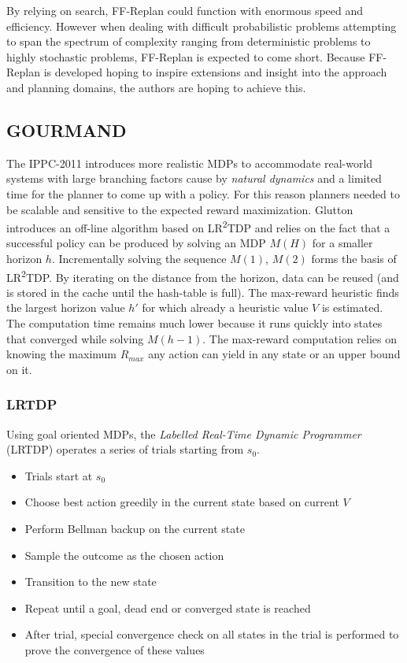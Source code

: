 \documentclass[runningheads,a4paper]{llncs}
\begin{document}
By relying on search, FF-Replan could function with enormous speed and efficiency. However when dealing with difficult probabilistic problems attempting to span the spectrum of complexity ranging from deterministic problems to highly stochastic problems, FF-Replan is expected to come short. Because FF-Replan is developed hoping to inspire extensions and insight into the approach and planning domains, the authors are hoping to achieve this.


\subsection{GOURMAND}

The IPPC-2011 introduces more realistic MDPs to accommodate real-world systems with large branching factors cause by \emph{natural dynamics} and a limited time for the planner to come up with a policy. For this reason planners needed to be scalable and sensitive to the expected reward maximization. Glutton introduces an off-line algorithm based on LR\textsuperscript{2}TDP and relies on the fact that a successful policy can be produced by solving an MDP $M(H)$ for a smaller horizon $h$. Incrementally solving the sequence $M(1)$, $M(2)$ forms the basis of LR\textsuperscript{2}TDP\@. By iterating on the distance from the horizon, data can be reused (and is stored in the cache until the hash-table is full). The max-reward heuristic finds the largest horizon value $h'$ for which already a heuristic value $V$ is estimated. The  computation time remains much lower because it runs quickly into states that converged while solving $M(h-1)$. The max-reward computation relies on knowing the maximum $R_{max}$ any action can yield in any state or an upper bound on it.

\subsubsection{LRTDP}
Using goal oriented MDPs, the \emph{Labelled Real-Time Dynamic Programmer} (LRTDP) operates a series of trials starting from $s_0$.

\begin{itemize}
	\item Trials start at $s_0$
	\item Choose best action greedily in the current state based on current $V$
	\item Perform  Bellman backup on the current state
	\item Sample the outcome as the chosen action
	\item Transition to the new state
	\item Repeat until a goal, dead end or converged state is reached
	\item After trial, special convergence check on all states in the trial is performed to prove the convergence of these values
\end{itemize}
\end{document}
